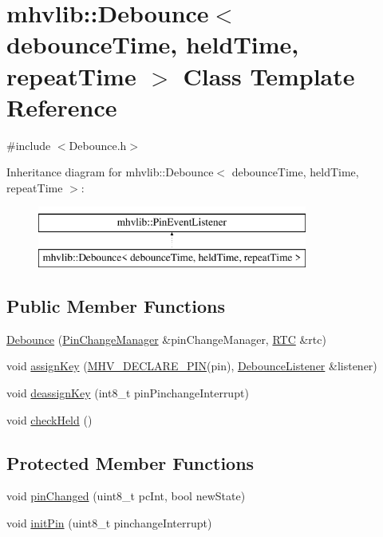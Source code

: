 \hypertarget{classmhvlib_1_1_debounce}{\section{mhvlib\-:\-:Debounce$<$ debounce\-Time, held\-Time, repeat\-Time $>$ Class Template Reference}
\label{classmhvlib_1_1_debounce}
}


{\ttfamily \#include $<$Debounce.\-h$>$}

Inheritance diagram for mhvlib\-:\-:Debounce$<$ debounce\-Time, held\-Time, repeat\-Time $>$\-:\begin{figure}[H]
\begin{center}
\leavevmode
\includegraphics[height=2.000000cm]{classmhvlib_1_1_debounce}
\end{center}
\end{figure}
\subsection*{Public Member Functions}
\begin{DoxyCompactItemize}
\item 
\hyperlink{classmhvlib_1_1_debounce_aced241255864ff44195cc6000287ef0f}{Debounce} (\hyperlink{classmhvlib_1_1_pin_change_manager}{Pin\-Change\-Manager} \&pin\-Change\-Manager, \hyperlink{classmhvlib_1_1_r_t_c}{R\-T\-C} \&rtc)
\item 
void \hyperlink{classmhvlib_1_1_debounce_ae25b18e47359cc03ac58eded6cbeaeaa}{assign\-Key} (\hyperlink{io_8h_afb172d17be3890bb07e5ceec5a014b91}{M\-H\-V\-\_\-\-D\-E\-C\-L\-A\-R\-E\-\_\-\-P\-I\-N}(pin), \hyperlink{classmhvlib_1_1_debounce_listener}{Debounce\-Listener} \&listener)
\item 
void \hyperlink{classmhvlib_1_1_debounce_a72fb4a7a39efced90d7dbea8c691c286}{deassign\-Key} (int8\-\_\-t pin\-Pinchange\-Interrupt)
\item 
void \hyperlink{classmhvlib_1_1_debounce_a432a7d4dd88965beef3f16bdbb865172}{check\-Held} ()
\end{DoxyCompactItemize}
\subsection*{Protected Member Functions}
\begin{DoxyCompactItemize}
\item 
void \hyperlink{classmhvlib_1_1_debounce_a48366cf03e885a4c739a9e5ab00be17e}{pin\-Changed} (uint8\-\_\-t pc\-Int, bool new\-State)
\item 
void \hyperlink{classmhvlib_1_1_debounce_a0df368d4ac0a2467148dde7d967d65ff}{init\-Pin} (uint8\-\_\-t pinchange\-Interrupt)
\end{DoxyCompactItemize}
